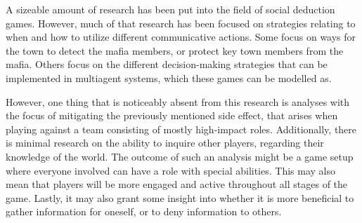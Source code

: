 A sizeable amount of research has been put into the field of social deduction
games. However, much of that research has been focused on strategies relating
to when and how to utilize different communicative actions\cite{commitment}.
Some focus on ways for the town to detect the mafia
members\cite{werewolf_stealth}, or protect key town members from the
mafia\cite{werewolf_nash_equilibrium}. Others focus on the different
decision-making strategies that can be implemented in multiagent systems, which
these games can be modelled
as\cite{modelling_multi_agent_epistemic_systems}\cite{multi_agent_epistemic_planner_common_knowledge}\cite{probibalistic_multiagent_systems}.

However, one thing that is noticeably absent from this research is analyses
with the focus of mitigating the previously mentioned side effect, that arises
when playing against a team consisting of mostly high-impact roles.
Additionally, there is minimal research on the ability to inquire other
players, regarding their knowledge of the world. The outcome of such an
analysis might be a game setup where everyone involved can have a role with
special abilities. This may also mean that players will be more engaged and
active throughout all stages of the game. Lastly, it may also grant some
insight into whether it is more beneficial to gather information for oneself,
or to deny information to others.